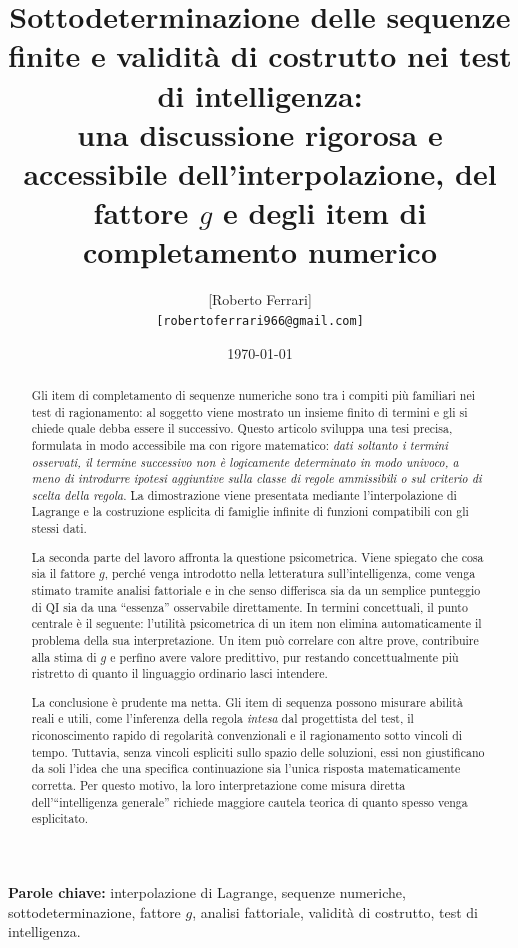 \documentclass[10pt, a4paper]{article}
\title{\textbf{Sottodeterminazione delle sequenze finite e validità di costrutto nei test di intelligenza:\\
una discussione rigorosa e accessibile dell'interpolazione, del fattore $g$ e degli item di completamento numerico}}
\author{
    [Roberto Ferrari]\\
    \small \texttt{[robertoferrari966@gmail.com]}
}
\date{\today}
\theoremstyle{plain}
\theoremstyle{definition}
\theoremstyle{remark}
\begin{document}
\maketitle
\thispagestyle{empty}

\begin{abstract}
Gli item di completamento di sequenze numeriche sono tra i compiti più familiari
nei test di ragionamento: al soggetto viene mostrato un insieme finito di termini
e gli si chiede quale debba essere il successivo. Questo articolo sviluppa una tesi
precisa, formulata in modo accessibile ma con rigore matematico: \emph{dati soltanto
i termini osservati, il termine successivo non è logicamente determinato in modo
univoco, a meno di introdurre ipotesi aggiuntive sulla classe di regole ammissibili
o sul criterio di scelta della regola}. La dimostrazione viene presentata mediante
l'interpolazione di Lagrange e la costruzione esplicita di famiglie infinite di
funzioni compatibili con gli stessi dati.

La seconda parte del lavoro affronta la questione psicometrica. Viene spiegato che
cosa sia il fattore $g$, perché venga introdotto nella letteratura sull'intelligenza,
come venga stimato tramite analisi fattoriale e in che senso differisca sia da un
semplice punteggio di QI sia da una ``essenza'' osservabile direttamente. In termini
concettuali, il punto centrale è il seguente: l'utilità psicometrica di un item non
elimina automaticamente il problema della sua interpretazione. Un item può correlare
con altre prove, contribuire alla stima di $g$ e perfino avere valore predittivo,
pur restando concettualmente più ristretto di quanto il linguaggio ordinario lasci
intendere.

La conclusione è prudente ma netta. Gli item di sequenza possono misurare abilità
reali e utili, come l'inferenza della regola \emph{intesa} dal progettista del test,
il riconoscimento rapido di regolarità convenzionali e il ragionamento sotto vincoli
di tempo. Tuttavia, senza vincoli espliciti sullo spazio delle soluzioni, essi non
giustificano da soli l'idea che una specifica continuazione sia l'unica risposta
matematicamente corretta. Per questo motivo, la loro interpretazione come misura
diretta dell'``intelligenza generale'' richiede maggiore cautela teorica di quanto
spesso venga esplicitato.
\end{abstract}

\vspace{1em}
\noindent\textbf{Parole chiave:} interpolazione di Lagrange, sequenze numeriche,
sottodeterminazione, fattore $g$, analisi fattoriale, validità di costrutto,
test di intelligenza.
\end{document}
